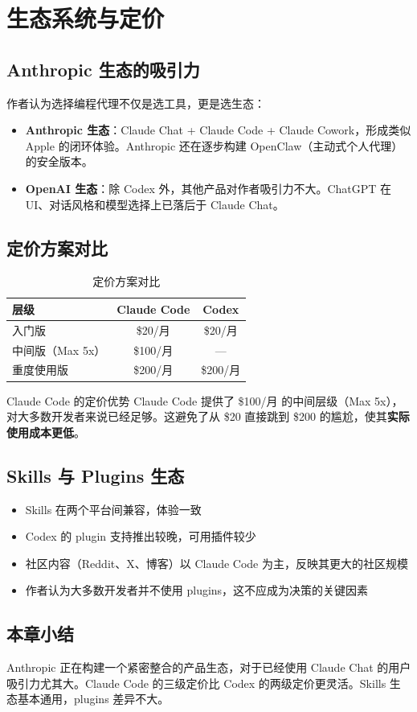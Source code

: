 \section{生态系统与定价}

\subsection{Anthropic 生态的吸引力}

作者认为选择编程代理不仅是选工具，更是选生态：

\begin{itemize}
    \item \textbf{Anthropic 生态}：Claude Chat + Claude Code + Claude Cowork，形成类似 Apple 的闭环体验。Anthropic 还在逐步构建 OpenClaw（主动式个人代理）的安全版本。
    \item \textbf{OpenAI 生态}：除 Codex 外，其他产品对作者吸引力不大。ChatGPT 在 UI、对话风格和模型选择上已落后于 Claude Chat。
\end{itemize}

\subsection{定价方案对比}

\begin{table}[H]
\centering
\caption{定价方案对比}
\begin{tabular}{lcc}
\toprule
\textbf{层级} & \textbf{Claude Code} & \textbf{Codex} \\
\midrule
入门版 & \$20/月 & \$20/月 \\
中间版（Max 5x） & \$100/月 & --- \\
重度使用版 & \$200/月 & \$200/月 \\
\bottomrule
\end{tabular}
\end{table}

\begin{importantbox}{Claude Code 的定价优势}
Claude Code 提供了 \$100/月 的中间层级（Max 5x），对大多数开发者来说已经足够。这避免了从 \$20 直接跳到 \$200 的尴尬，使其\textbf{实际使用成本更低}。
\end{importantbox}

\subsection{Skills 与 Plugins 生态}

\begin{itemize}
    \item Skills 在两个平台间兼容，体验一致
    \item Codex 的 plugin 支持推出较晚，可用插件较少
    \item 社区内容（Reddit、X、博客）以 Claude Code 为主，反映其更大的社区规模
    \item 作者认为大多数开发者并不使用 plugins，这不应成为决策的关键因素
\end{itemize}

\subsection{本章小结}

Anthropic 正在构建一个紧密整合的产品生态，对于已经使用 Claude Chat 的用户吸引力尤其大。Claude Code 的三级定价比 Codex 的两级定价更灵活。Skills 生态基本通用，plugins 差异不大。

